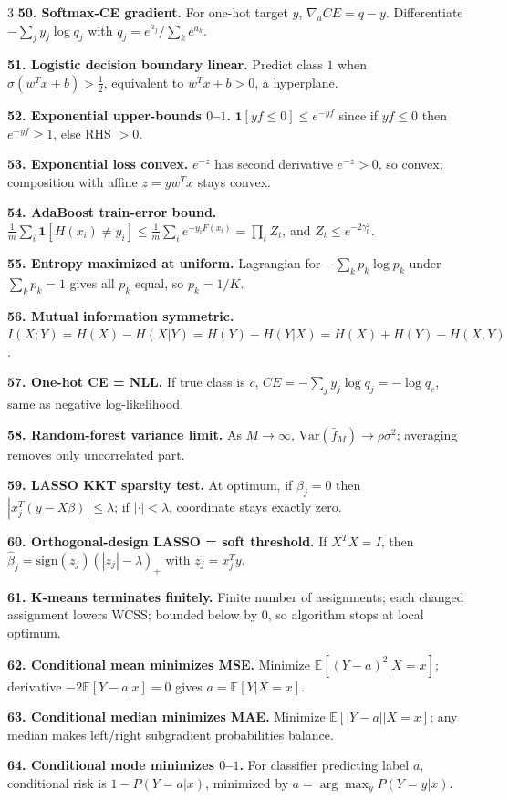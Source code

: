 \documentclass[8pt,fleqn]{extarticle}
\begin{document}
\begin{multicols}{3}
\textbf{50. Softmax-CE gradient.} For one-hot target $y$, $\nabla_a CE=q-y$. Differentiate $-\sum_j y_j\log q_j$ with $q_j=e^{a_j}/\sum_k e^{a_k}$.

\textbf{51. Logistic decision boundary linear.} Predict class $1$ when $\sigma(w^Tx+b)>\frac12$, equivalent to $w^Tx+b>0$, a hyperplane.

\textbf{52. Exponential upper-bounds $0$--$1$.} $\mathbf1[yf\le0]\le e^{-yf}$ since if $yf\le0$ then $e^{-yf}\ge1$, else RHS $>0$.

\textbf{53. Exponential loss convex.} $e^{-z}$ has second derivative $e^{-z}>0$, so convex; composition with affine $z=yw^Tx$ stays convex.

\textbf{54. AdaBoost train-error bound.} $\frac1m\sum_i\mathbf1[H(x_i)\neq y_i]\le\frac1m\sum_i e^{-y_iF(x_i)}=\prod_t Z_t$, and $Z_t\le e^{-2\gamma_t^2}$.

\textbf{55. Entropy maximized at uniform.} Lagrangian for $-\sum_k p_k\log p_k$ under $\sum_k p_k=1$ gives all $p_k$ equal, so $p_k=1/K$.

\textbf{56. Mutual information symmetric.} $I(X;Y)=H(X)-H(X|Y)=H(Y)-H(Y|X)=H(X)+H(Y)-H(X,Y)$.

\textbf{57. One-hot CE = NLL.} If true class is $c$, $CE=-\sum_j y_j\log q_j=-\log q_c$, same as negative log-likelihood.

\textbf{58. Random-forest variance limit.} As $M\to\infty$, $\mathrm{Var}(\bar f_M)\to\rho\sigma^2$; averaging removes only uncorrelated part.

\textbf{59. LASSO KKT sparsity test.} At optimum, if $\beta_j=0$ then $|x_j^T(y-X\beta)|\le\lambda$; if $|\cdot|<\lambda$, coordinate stays exactly zero.

\textbf{60. Orthogonal-design LASSO = soft threshold.} If $X^TX=I$, then $\hat\beta_j=\mathrm{sign}(z_j)(|z_j|-\lambda)_+$ with $z_j=x_j^Ty$.

\textbf{61. K-means terminates finitely.} Finite number of assignments; each changed assignment lowers WCSS; bounded below by $0$, so algorithm stops at local optimum.

\textbf{62. Conditional mean minimizes MSE.} Minimize $\mathbb E[(Y-a)^2|X=x]$; derivative $-2\mathbb E[Y-a|x]=0$ gives $a=\mathbb E[Y|X=x]$.

\textbf{63. Conditional median minimizes MAE.} Minimize $\mathbb E[|Y-a||X=x]$; any median makes left/right subgradient probabilities balance.

\textbf{64. Conditional mode minimizes $0$--$1$.} For classifier predicting label $a$, conditional risk is $1-P(Y=a|x)$, minimized by $a=\arg\max_y P(Y=y|x)$.


\end{multicols}
\end{document}
